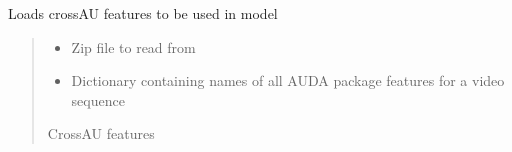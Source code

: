 \documentclass[letterpaper,10pt,english]{sphinxmanual}
\begin{document}
\begin{fulllineitems}
\label{\detokenize{dataset:dataset.load_features_crossau}}
\pysigstartsignatures
{}
\pysigstopsignatures
\sphinxAtStartPar
Loads cross\sphinxhyphen{}AU features to be used in model
\begin{quote}\begin{description}
\begin{itemize}
\item {} 
\sphinxAtStartPar
{} \textendash{} Zip file to read from

\item {} 
\sphinxAtStartPar
{} \textendash{} Dictionary containing names of all AUDA package features for a video sequence

\end{itemize}

\sphinxAtStartPar
Cross\sphinxhyphen{}AU features

\end{description}\end{quote}

\end{fulllineitems}

\end{document}
